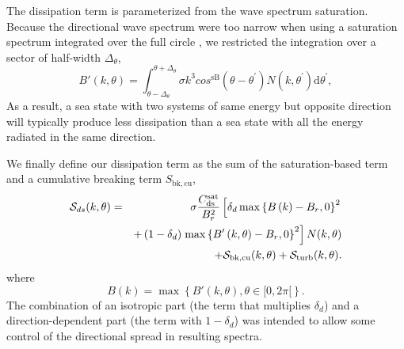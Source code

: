 \noindent
The dissipation term is parameterized from the wave spectrum saturation. Because the directional wave spectrum 
were too narrow when using a 
saturation spectrum integrated over the full circle \citep{art:AL06},
we restricted the integration over a sector of half-width $\Delta_\theta$, 
\begin{equation}
B'\left(k,\theta\right)=
\int_{\theta-\Delta_\theta}^{\theta+\Delta_\theta} \sigma k^3 cos^{\mathrm{sB}}\left(\theta-
\theta^{\prime}\right) N(k,\theta^{\prime}) \mathrm d
\theta^{\prime} \label{defBofkprime},
\end{equation}
As a result, a sea state with two systems of same energy but opposite direction will typically produce less dissipation than a sea state 
with all the energy radiated in the same direction. 

We finally define our dissipation term as the sum of the saturation-based term and a cumulative breaking term
$S_{\mathrm{bk,cu}}$, 
\begin{eqnarray}
{\cal S}_{ds}(k,\theta)& =&  \sigma
 \frac{C_{\mathrm{ds}}^{\mathrm{sat}}}{B^2_r} \left[ \delta_d
\max\left\{ B\left(k\right) -
B_r,0\right\}^2 \right.
\nonumber \\
  & & +  \left(1-\delta_d \right) \left. \max\left\{B'\left(k,\theta \right)- B_r
 ,0\right\}^2\right]N(k,\theta)  \nonumber \\
 & & + {\cal S}_{\mathrm{bk,cu}}(k,\theta) + {\cal S}_{\mathrm{turb}}(k,\theta) \label{Sds_all}.
\end{eqnarray}
where
\begin{equation}
B\left(k \right)=\max\left\{B'(k,\theta), \theta \in [0,2
\pi[\right\} \label{defBof}.
\end{equation}
The combination of an isotropic part (the term that multiplies $ \delta_d$) and a direction-dependent part (the term with  $1-\delta_d$) was intended
 to allow some control of the directional spread in resulting spectra. 

